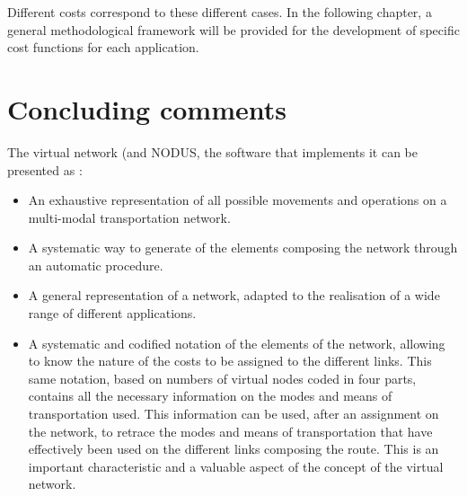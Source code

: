 Different costs correspond to these different cases.  In the following
chapter, a general methodological framework will be provided for the development
of specific cost functions for each application.




\section{Concluding comments}


The virtual network (and NODUS, the software that implements it can be presented as :


\begin{itemize}
\item An exhaustive representation of all possible movements and operations on a
multi-modal transportation network.
\item A systematic way to generate of the elements composing the network
through an automatic procedure.
\item A general representation of a network, adapted to the realisation of a wide
range of different applications.
\item A systematic and codified notation of the elements of the network, allowing to
know the nature of the costs to be assigned to the different links.  This same
notation, based on numbers of virtual nodes coded in four parts, contains all
the necessary information on the modes and means of transportation used.  This
information can be used,  after an assignment on the network, to retrace
the modes and means of transportation that have effectively been used on the
different links composing the route.  This is an important characteristic and a valuable
aspect of the concept of the virtual network.
\end{itemize}


